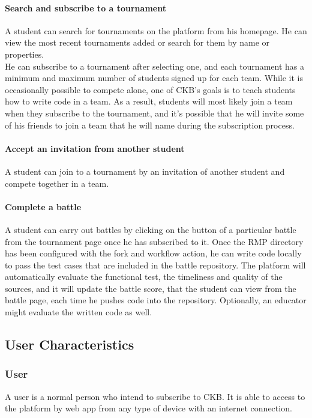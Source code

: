 \paragraph{Search and subscribe to a tournament}
A student can search for tournaments on the platform from his homepage. He can view the most recent tournaments added or search for them by name or properties.\\
He can subscribe to a tournament after selecting one, and each tournament has a minimum and maximum number of students signed up for each team. While it is occasionally possible to compete alone, one of CKB's goals is to teach 
students how to write code in a team. As a result, students will most likely join a team when they subscribe to the tournament, and it's possible that he will invite some of his friends to join a team that he will name during the 
subscription process.

\paragraph{Accept an invitation from another student}
A student can join to a tournament by an invitation of another student and compete together in a team.

\paragraph{Complete a battle}
A student can carry out battles by clicking on the button of a particular battle from the tournament page once he has subscribed to it. Once the RMP directory has been configured with the fork and workflow action, he can write code 
locally to pass the test cases that are included in the battle repository. The platform will automatically evaluate the functional test, the timeliness and quality of the sources, and it will update the battle score, that the student 
can view from the battle page, each time he pushes code into the repository. Optionally, an educator might evaluate the written code as well.

\subsection{User Characteristics}

\subsubsection{User}
A user is a normal person who intend to subscribe to CKB. It is able to access to the platform by web app from any type of device with an internet connection.

